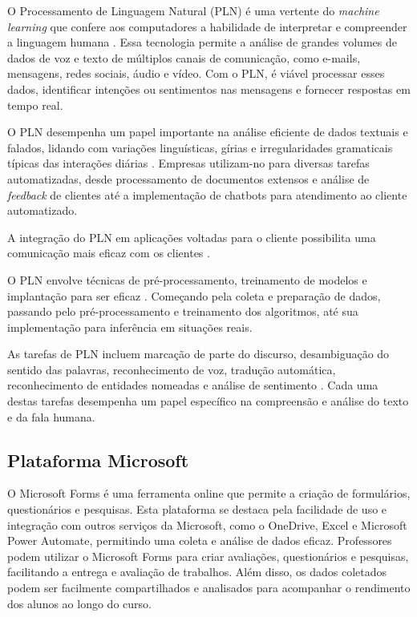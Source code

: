 O Processamento de Linguagem Natural (PLN) é uma vertente do \textit{machine learning} que confere aos computadores a habilidade de interpretar e compreender a linguagem humana \cite{amazonnlp2023}. Essa tecnologia permite a análise de grandes volumes de dados de voz e texto de múltiplos canais de comunicação, como e-mails, mensagens, redes sociais, áudio e vídeo. Com o PLN, é viável processar esses dados, identificar intenções ou sentimentos nas mensagens e fornecer respostas em tempo real.

O PLN desempenha um papel importante na análise eficiente de dados textuais e falados, lidando com variações linguísticas, gírias e irregularidades gramaticais típicas das interações diárias \cite{amazonnlp2023}. Empresas utilizam-no para diversas tarefas automatizadas, desde processamento de documentos extensos e análise de \textit{feedback} de clientes até a implementação de chatbots para atendimento ao cliente automatizado.

A integração do PLN em aplicações voltadas para o cliente possibilita uma comunicação mais eficaz com os clientes \cite{amazonnlp2023}. 

O PLN envolve técnicas de pré-processamento, treinamento de modelos e implantação para ser eficaz \cite{amazonnlp2023}. Começando pela coleta e preparação de dados, passando pelo pré-processamento e treinamento dos algoritmos, até sua implementação para inferência em situações reais.

As tarefas de PLN incluem marcação de parte do discurso, desambiguação do sentido das palavras, reconhecimento de voz, tradução automática, reconhecimento de entidades nomeadas e análise de sentimento \cite{amazonnlp2023}. Cada uma destas tarefas desempenha um papel específico na compreensão e análise do texto e da fala humana.

\subsection{Plataforma Microsoft}

O Microsoft Forms é uma ferramenta online que permite a criação de formulários, questionários e pesquisas. Esta plataforma se destaca pela facilidade de uso e integração com outros serviços da Microsoft, como o OneDrive, Excel e Microsoft Power Automate, permitindo uma coleta e análise de dados eficaz. Professores podem utilizar o Microsoft Forms para criar avaliações, questionários e pesquisas, facilitando a entrega e avaliação de trabalhos. Além disso, os dados coletados podem ser facilmente compartilhados e analisados para acompanhar o rendimento dos alunos ao longo do curso.

